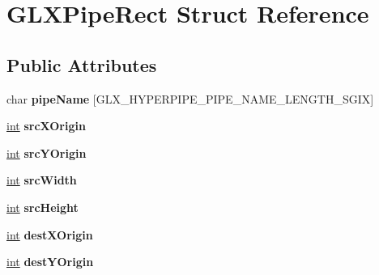\hypertarget{struct_g_l_x_pipe_rect}{}\section{G\+L\+X\+Pipe\+Rect Struct Reference}
\label{struct_g_l_x_pipe_rect}
\subsection*{Public Attributes}
\begin{DoxyCompactItemize}
\item 
\hypertarget{struct_g_l_x_pipe_rect_aa4c4f60e9647705ddefa10f95a37cb79}{}char {\bfseries pipe\+Name} \mbox{[}G\+L\+X\+\_\+\+H\+Y\+P\+E\+R\+P\+I\+P\+E\+\_\+\+P\+I\+P\+E\+\_\+\+N\+A\+M\+E\+\_\+\+L\+E\+N\+G\+T\+H\+\_\+\+S\+G\+I\+X\mbox{]}\label{struct_g_l_x_pipe_rect_aa4c4f60e9647705ddefa10f95a37cb79}

\item 
\hypertarget{struct_g_l_x_pipe_rect_a9df2313c01f75d149e64f2ff467bc266}{}\hyperlink{_s_d_l__thread_8h_a6a64f9be4433e4de6e2f2f548cf3c08e}{int} {\bfseries src\+X\+Origin}\label{struct_g_l_x_pipe_rect_a9df2313c01f75d149e64f2ff467bc266}

\item 
\hypertarget{struct_g_l_x_pipe_rect_a1f7316dff7050ab2ce9d3d37f8c5450e}{}\hyperlink{_s_d_l__thread_8h_a6a64f9be4433e4de6e2f2f548cf3c08e}{int} {\bfseries src\+Y\+Origin}\label{struct_g_l_x_pipe_rect_a1f7316dff7050ab2ce9d3d37f8c5450e}

\item 
\hypertarget{struct_g_l_x_pipe_rect_a2c6c180a4dabb71076366e06a1c7d0ef}{}\hyperlink{_s_d_l__thread_8h_a6a64f9be4433e4de6e2f2f548cf3c08e}{int} {\bfseries src\+Width}\label{struct_g_l_x_pipe_rect_a2c6c180a4dabb71076366e06a1c7d0ef}

\item 
\hypertarget{struct_g_l_x_pipe_rect_a35632524bce6bffa05f284a9b1c1b8ff}{}\hyperlink{_s_d_l__thread_8h_a6a64f9be4433e4de6e2f2f548cf3c08e}{int} {\bfseries src\+Height}\label{struct_g_l_x_pipe_rect_a35632524bce6bffa05f284a9b1c1b8ff}

\item 
\hypertarget{struct_g_l_x_pipe_rect_a8b7b941894ad3420326d7e9fa885bb71}{}\hyperlink{_s_d_l__thread_8h_a6a64f9be4433e4de6e2f2f548cf3c08e}{int} {\bfseries dest\+X\+Origin}\label{struct_g_l_x_pipe_rect_a8b7b941894ad3420326d7e9fa885bb71}

\item 
\hypertarget{struct_g_l_x_pipe_rect_aef7766b02ef07c20a11e89da5878b469}{}\hyperlink{_s_d_l__thread_8h_a6a64f9be4433e4de6e2f2f548cf3c08e}{int} {\bfseries dest\+Y\+Origin}\label{struct_g_l_x_pipe_rect_aef7766b02ef07c20a11e89da5878b469}


\end{DoxyCompactItemize}
